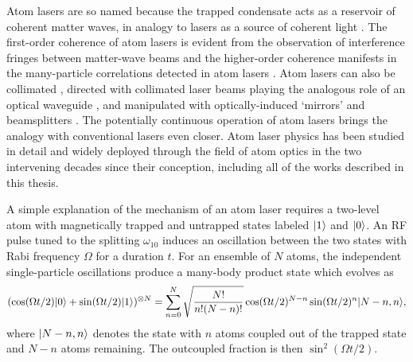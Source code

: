 	Atom lasers are so named because the trapped condensate acts as a reservoir of coherent matter waves, in analogy to lasers as a source of coherent light \cite{Naraschewski99,Glauber63}.
	The first-order coherence of atom lasers is evident from the observation of interference fringes between matter-wave beams \cite{Andrews97} and the higher-order coherence manifests in the many-particle correlations detected in \mhe atom lasers \cite{Manning10,Dall11a,Rugway11}.
	Atom lasers can also be collimated \cite{Bloch99}, directed with collimated laser beams playing the analogous role of an optical waveguide \cite{Guerin06,Couvert08}, and manipulated with optically-induced `mirrors' and beamsplitters \cite{Bloch01}.
	The potentially continuous operation of atom lasers \cite{Chikkatur02} brings the analogy with conventional lasers even closer.
	Atom laser physics has been studied in detail and widely deployed through the field of atom optics in the two intervening decades since their conception, including all of the works described in this thesis.
	


	A simple explanation of the mechanism of an atom laser requires a two-level atom with magnetically trapped and untrapped states labeled $|1\rangle$ and $|0\rangle$.
	An RF pulse tuned to the splitting $\omega_{10}$ induces an oscillation between the two states with Rabi frequency $\Omega$ for a duration $t$.
	For an ensemble of $N$ atoms, the independent single-particle oscillations produce a many-body product state which evolves as \cite{Mewes97}
	\begin{equation}
		(\cos(\Omega t/2)|0\rangle + \sin(\Omega t/2)|1\rangle)^{\otimes N} = \sum_{n=0}^{ N}\sqrt{\frac{N!}{n!(N-n)!}}\cos(\Omega t/2)^{N-n}\sin(\Omega t/2)^n|N-n,n\rangle,
		\label{eqn:PAL_Rabi}
	\end{equation}
	where $|N-n,n\rangle$ denotes the state with $n$ atoms coupled out of the trapped state and $N-n$ atoms remaining.
	The outcoupled fraction is then $\sin^2(\Omega t/2)$.

